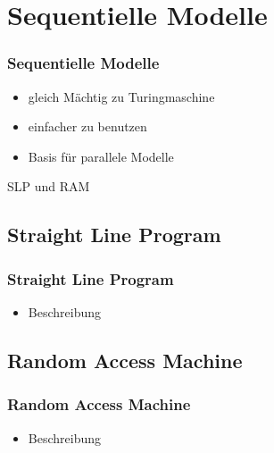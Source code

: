 \section{Sequentielle Modelle}

\begin{frame}
    \frametitle{Sequentielle Modelle}
    \begin{itemize}
        \item gleich Mächtig zu Turingmaschine
        \item einfacher zu benutzen
        \item Basis für parallele Modelle
    \end{itemize}
    SLP und RAM
\end{frame}

\subsection{Straight Line Program}
\begin{frame}
    \frametitle{Straight Line Program}
    \begin{itemize}
        \item Beschreibung
    \end{itemize}
\end{frame}

\subsection{Random Access Machine}
\begin{frame}
    \frametitle{Random Access Machine}
    \begin{itemize}
        \item Beschreibung
    \end{itemize}
\end{frame}
